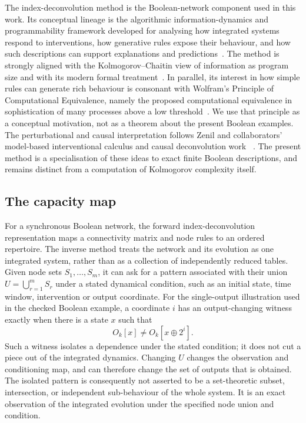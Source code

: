 \documentclass[11pt,a4paper]{article}
\begin{document}
The index-deconvolution method is the Boolean-network component used in this work.
Its conceptual lineage is the algorithmic
information-dynamics and programmability framework developed for analysing
how integrated systems respond to interventions, how generative rules expose
their behaviour, and how such descriptions can support explanations and
predictions~\cite{hernandez2019aid,hernandez2021aid,zenil2019calculus,
zenil2019deconvolution}. The method is strongly aligned with the
Kolmogorov--Chaitin view of information as program size and with its modern
formal treatment~\cite{kolmogorov1965,chaitin1966,li2019}. In parallel, its
interest in how simple rules can generate rich behaviour is consonant with
Wolfram's Principle of Computational Equivalence, namely the proposed
computational equivalence in sophistication of many processes above a low
threshold~\cite{wolfram2002,wolfram2002pce}. We use that principle as a
conceptual motivation, not as a theorem about the present Boolean examples.
The perturbational and causal interpretation follows Zenil and collaborators'
model-based interventional calculus and causal deconvolution work~
\cite{zenil2017causality,zenil2019calculus,zenil2019deconvolution}. The
present method is a specialisation of these ideas to exact finite Boolean
descriptions, and remains distinct from a computation of Kolmogorov
complexity itself.

\subsection{The capacity map}

For a synchronous Boolean network, the forward index-deconvolution representation
maps a connectivity matrix and node rules to an ordered repertoire. The
inverse method treats the network and its evolution as one integrated system,
rather than as a collection of independently reduced tables. Given node sets
$S_1,\ldots,S_m$, it can ask for a pattern associated with their union
$U=\bigcup_{r=1}^{m}S_r$ under a stated dynamical condition, such as an
initial state, time window, intervention or output coordinate. For the
single-output illustration used in the checked Boolean example, a coordinate
$i$ has an output-changing witness exactly when there is a state $x$ such that
\begin{equation}
  O_k[x]\ne O_k[x\mathbin{\oplus}2^i].
\end{equation}
Such a witness isolates a dependence under the stated condition; it does not
cut a piece out of the integrated dynamics. Changing $U$ changes the
observation and conditioning map, and can therefore change the set of outputs
that is obtained. The isolated pattern is consequently not asserted to be a
set-theoretic subset, intersection, or independent sub-behaviour of the whole
system. It is an exact observation of the integrated evolution under the
specified node union and condition.
\end{document}
